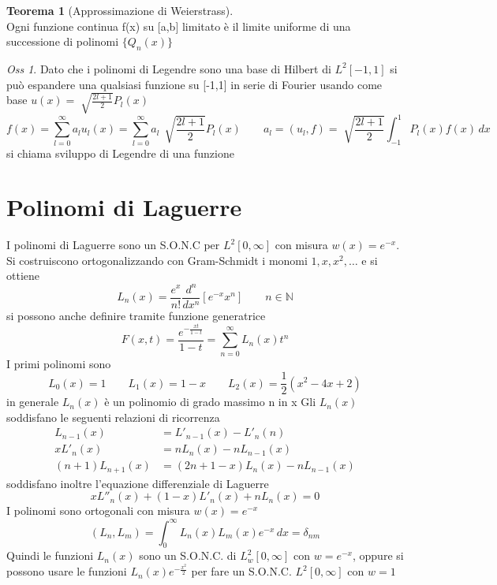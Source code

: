 \documentclass[a4paper,11pt]{report}
\theoremstyle{remark}
\newtheorem*{oss}{Oss}
\theoremstyle{definition}
\newtheorem*{teo}{Teorema}
\begin{document}
\begin{teo}[Approssimazione di Weierstrass]\hfill\\
	Ogni funzione continua f(x) su [a,b] limitato è il limite uniforme di una successione di polinomi $\{Q_n(x)\}$
\end{teo}

\begin{oss}
	Dato che i polinomi di Legendre sono una base di Hilbert di $L^2[-1,1]$ si può espandere una qualsiasi funzione su [-1,1] in serie di Fourier usando come base $u(x) = \sqrt[]{\frac{2l+1}{2}}P_l(x)$
	\begin{equation*}
		f(x) = \sum_{l=0}^\infty a_l u_l(x) = \sum_{l=0}^\infty a_l\,  \sqrt[]{\frac{2l+1}{2}}P_l(x) \qquad a_l = (u_l,f) = \sqrt[]{\frac{2l+1}{2}}\int_{-1}^1 P_l(x)f(x)\, dx 
	\end{equation*}
	si chiama sviluppo di Legendre di una funzione 
\end{oss}

\section{Polinomi di Laguerre}

I polinomi di Laguerre sono un S.O.N.C  per $L^2[0,\infty]$ con misura $w(x)= e^{-x}$. Si costruiscono ortogonalizzando con Gram-Schmidt i monomi $1,x,x^2,\dots$ e si ottiene
\begin{equation*}
	L_n(x) = \frac{e^x}{n!}\frac{d^n}{dx^n}[e^{-x}x^n] \qquad n\in \mathbb{N}
\end{equation*}
si possono anche definire tramite funzione generatrice 
\begin{equation*}
	F(x,t) = \frac{e^{-\frac{xt}{1-t}}}{1-t} = \sum_{n=0}^\infty L_n(x)t^n
\end{equation*}
I primi polinomi sono
\begin{equation*}
	L_0(x)=1 \qquad L_1(x)=1-x \qquad L_2(x)=\frac{1}{2}(x^2-4x+2)
\end{equation*}
in generale $L_n(x)$ è un polinomio di grado massimo n in x \newline
Gli $L_n(x)$ soddisfano le seguenti relazioni di ricorrenza
\begin{align*}
	L_{n-1}(x)&=L'_{n-1}(x)-L'_n(n)\\
	xL'_n(x) &= nL_n(x)- nL_{n-1}(x)\\
	(n+1)L_{n+1}(x) &= (2n+1-x)L_n(x)-nL_{n-1}(x)
\end{align*}
soddisfano inoltre l'equazione differenziale di Laguerre 
\begin{equation*}
	xL''_n(x) + (1-x)L'_n(x) + nL_n(x) =0
\end{equation*}
I polinomi sono ortogonali con misura $w(x)=e^{-x}$
\begin{equation*}
	(L_n,L_m) = \int_0^\infty L_n(x)L_m(x)e^{-x} \, dx = \delta_{nm}
\end{equation*}
Quindi le funzioni $L_n(x)$ sono un S.O.N.C. di $L^2_w[0,\infty]$ con $w = e^{-x}$, oppure si possono usare le funzioni $L_n(x)e^{-\frac{x^2}{2}}$ per fare un S.O.N.C. $L^2[0,\infty]$ con $w=1$
\end{document}
